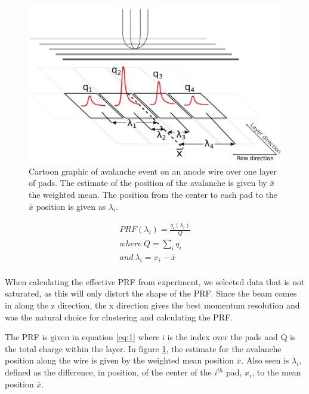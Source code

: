 \documentclass[review]{elsarticle}
\begin{document}
\begin{figure}[h]
\includegraphics[width=\linewidth]{defofavalanche}
\caption{Cartoon graphic of avalanche event on an anode wire over one layer of pads. The estimate of the position of the avalanche is given by $\bar{x}$  the weighted mean. The position from the center to each pad to the $\bar{x}$ position is given as $\lambda_i$.}
\label{fig:av}
\end{figure}

\begin{equation}\label{eq:1}
\begin{split}
PRF(\lambda_i) = \frac{q_i(\lambda_i)}{Q}\\
where \ Q=\sum_i q_i\\
and \   \lambda_i=x_i-\bar{x}\\
\end{split}
\end{equation}

When calculating the effective PRF from experiment, we selected data that is not saturated, as this will only distort the shape of the PRF. Since the beam comes in along the z direction, the x direction gives the best momentum resolution and was the natural choice for clustering and calculating the PRF. 

The PRF is given in equation \ref{eq:1} where i is the index over the pads and Q is the total charge within the layer. In figure \ref{fig:av}, the estimate for the avalanche position along the wire is given by the weighted mean position $\bar{x}$. Also seen is $\lambda_i$, defined as the difference, in position, of the center of the $i^{th}$ pad, $x_i$, to the mean position $\bar{x}$. 
\end{document}

